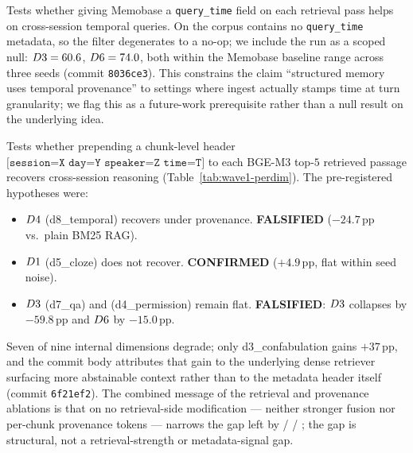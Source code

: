 Tests whether giving Memobase a \texttt{query\_time} field on each
retrieval pass helps on cross-session temporal queries. On \benchL
the corpus contains no \texttt{query\_time} metadata, so the filter
degenerates to a no-op; we include the run as a scoped null:
$D3 = 60.6$, $D6 = 74.0$, both within the Memobase
baseline range across three seeds (commit \texttt{8036ce3}). This
constrains the claim ``structured memory uses temporal provenance''
to settings where ingest actually stamps time at turn granularity;
we flag this as a future-work prerequisite rather than a null result
on the underlying idea.

Tests whether prepending a chunk-level header
$\texttt{[session=X day=Y speaker=Z time=T]}$ to each BGE-M3 top-$5$
retrieved passage recovers cross-session reasoning
(Table~\ref{tab:wave1-perdim}). The pre-registered hypotheses were:

\begin{itemize}
\itemsep=1pt\topsep=2pt
\item $D4$ (d8\_temporal) recovers under
  provenance. \textbf{FALSIFIED} ($-24.7$\,pp vs.\ plain BM25 RAG).
\item $D1$ (d5\_cloze) does not recover.
  \textbf{CONFIRMED} ($+4.9$\,pp, flat within seed noise).
\item $D3$ (d7\_qa) and \DSixID (d4\_permission)
  remain flat. \textbf{FALSIFIED}: $D3$ collapses by
  $-59.8$\,pp and $D6$ by $-15.0$\,pp.
\end{itemize}

Seven of nine internal dimensions degrade; only d3\_confabulation gains
$+37$\,pp, and the commit body attributes that gain to the underlying
dense retriever surfacing more abstainable context rather than to the
metadata header itself (commit \texttt{6f21ef2}). The combined message
of the retrieval and provenance ablations is that on \benchL no retrieval-side modification ---
neither stronger fusion nor per-chunk provenance tokens --- narrows
the gap left by \DFourID / \DSixID / \DTwoID; the gap is
structural, not a retrieval-strength or metadata-signal gap.

